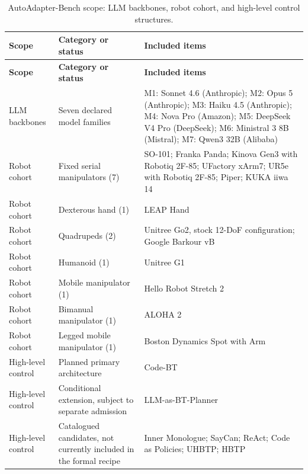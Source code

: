 \setcounter{chapter}{1}
\setcounter{table}{0}
\markboth{}{}

\begingroup
\small
{}
\renewcommand{\arraystretch}{1.15}
\begin{longtable}{@{}>{\raggedright\arraybackslash}p{20mm}>{\raggedright\arraybackslash}p{32mm}>{\raggedright\arraybackslash}p{74mm}@{}}
\caption{AutoAdapter-Bench scope: LLM backbones, robot cohort, and high-level control structures.}
\label{tab:appendix-benchmark-scope}\\
\toprule
\textbf{Scope} & \textbf{Category or status} & \textbf{Included items} \\
\midrule
\endfirsthead
\toprule
\textbf{Scope} & \textbf{Category or status} & \textbf{Included items} \\
\midrule
\endhead
\endfoot
\bottomrule
\endlastfoot
LLM backbones & Seven declared model families & M1: Sonnet 4.6 (Anthropic); M2: Opus 5 (Anthropic); M3: Haiku 4.5 (Anthropic); M4: Nova Pro (Amazon); M5: DeepSeek V4 Pro (DeepSeek); M6: Ministral 3 8B (Mistral); M7: Qwen3 32B (Alibaba) \\
Robot cohort & Fixed serial manipulators (7) & SO-101; Franka Panda; Kinova Gen3 with Robotiq 2F-85; UFactory xArm7; UR5e with Robotiq 2F-85; Piper; KUKA iiwa 14 \\
Robot cohort & Dexterous hand (1) & LEAP Hand \\
Robot cohort & Quadrupeds (2) & Unitree Go2, stock 12-DoF configuration; Google Barkour vB \\
Robot cohort & Humanoid (1) & Unitree G1 \\
Robot cohort & Mobile manipulator (1) & Hello Robot Stretch 2 \\
Robot cohort & Bimanual manipulator (1) & ALOHA 2 \\
Robot cohort & Legged mobile manipulator (1) & Boston Dynamics Spot with Arm \\
High-level control & Planned primary architecture & Code-BT \\
High-level control & Conditional extension, subject to separate admission & LLM-as-BT-Planner \\
High-level control & Catalogued candidates, not currently included in the formal recipe & Inner Monologue; SayCan; ReAct; Code as Policies; UHBTP; HBTP \\
\end{longtable}

